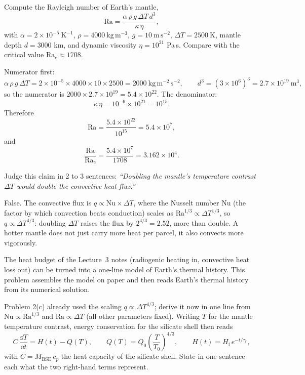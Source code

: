 \parti Compute the Rayleigh number of Earth's mantle,
\[
  \mathrm{Ra} = \frac{\alpha\,\rho\,g\,\Delta T\,d^3}{\kappa\,\eta},
\]
with $\alpha = 2 \times 10^{-5}\ \mathrm{K^{-1}}$, $\rho = 4000\ \mathrm{kg\,m^{-3}}$,
$g = 10\ \mathrm{m\,s^{-2}}$, $\Delta T = 2500\ \mathrm{K}$, mantle depth $d = 3000$ km, and
dynamic viscosity $\eta = 10^{21}$ Pa\,s.
Compare with the critical value $\mathrm{Ra}_c \approx 1708$.

\begin{solution}
Numerator first:
\[
  \alpha\,\rho\,g\,\Delta T = 2 \times 10^{-5} \times 4000 \times 10 \times 2500 = 2000\ \mathrm{kg\,m^{-2}\,s^{-2}},
  \qquad
  d^3 = (3 \times 10^{6})^3 = 2.7 \times 10^{19}\ \mathrm{m^3},
\]
so the numerator is $2000 \times 2.7 \times 10^{19} = 5.4 \times 10^{22}$. The denominator:
\[
  \kappa\,\eta = 10^{-6} \times 10^{21} = 10^{15}.
\]
Therefore
\[
  \mathrm{Ra} = \frac{5.4 \times 10^{22}}{10^{15}} = 5.4 \times 10^{7},
\]
and
\[
  \frac{\mathrm{Ra}}{\mathrm{Ra}_c} = \frac{5.4 \times 10^{7}}{1708} = 3.162 \times 10^{4}.
\]
\end{solution}

\parti Judge this claim in 2 to 3 sentences:
\emph{``Doubling the mantle's temperature contrast $\Delta T$ would double the convective heat flux.''}

\begin{solution}
False. The convective flux is $q \propto \mathrm{Nu} \times \Delta T$, where the Nusselt
number Nu (the factor by which convection beats conduction) scales as
$\mathrm{Ra}^{1/3} \propto \Delta T^{1/3}$, so
$q \propto \Delta T^{4/3}$: doubling $\Delta T$ raises the flux by
$2^{4/3} = 2.52$, more than double. A hotter mantle does not just carry more heat per
parcel, it also convects more vigorously.
\end{solution}



The heat budget of the Lecture~3 notes (radiogenic heating in, convective heat loss out) can be
turned into a one-line model of Earth's thermal history. This problem assembles the model on
paper and then reads Earth's thermal history from its numerical solution.

\parti Problem 2(c) already used the scaling $q \propto \Delta T^{4/3}$; derive it now in one
line from $\mathrm{Nu} \propto \mathrm{Ra}^{1/3}$ and $\mathrm{Ra} \propto \Delta T$ (all other
parameters fixed). Writing $T$ for the mantle temperature contrast, energy
conservation for the silicate shell then reads
\[
  C\,\frac{\dd T}{\dd t} = H(t) - Q(T),
  \qquad
  Q(T) = Q_0 \left(\frac{T}{T_0}\right)^{4/3},
  \qquad
  H(t) = H_\mathrm{f}\,e^{-t/\tau_r},
\]
with $C = M_\mathrm{BSE}\,c_p$ the heat capacity of the silicate shell.
State in one sentence each what the two right-hand terms represent.

